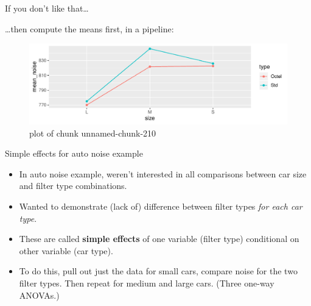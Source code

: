 \documentclass[ignorenonframetext,]{beamer}
\newenvironment{Shaded}{\begin{snugshade}}{\end{snugshade}}
\newcommand{\DataTypeTok}[1]{\textcolor[rgb]{0.13,0.29,0.53}{#1}}
\newcommand{\KeywordTok}[1]{\textcolor[rgb]{0.13,0.29,0.53}{\textbf{#1}}}
\newcommand{\NormalTok}[1]{#1}
\newcommand{\OperatorTok}[1]{\textcolor[rgb]{0.81,0.36,0.00}{\textbf{#1}}}
\newcommand{\StringTok}[1]{\textcolor[rgb]{0.31,0.60,0.02}{#1}}
\begin{document}
\begin{frame}[fragile]{If you don't like that\ldots}
\protect\hypertarget{if-you-dont-like-that}{}

\ldots then compute the means first, in a pipeline:

\footnotesize

\begin{Shaded}
\end{Shaded}

\begin{figure}
\centering
\includegraphics{figure/unnamed-chunk-210-1.pdf}
\caption{plot of chunk unnamed-chunk-210}
\end{figure}

\normalsize

\end{frame}

\begin{frame}{Simple effects for auto noise example}
\protect\hypertarget{simple-effects-for-auto-noise-example}{}

\begin{itemize}
\item
  In auto noise example, weren't interested in all comparisons between
  car size and filter type combinations.
\item
  Wanted to demonstrate (lack of) difference between filter types
  \emph{for each car type}.
\item
  These are called \textbf{simple effects} of one variable (filter type)
  conditional on other variable (car type).
\item
  To do this, pull out just the data for small cars, compare noise for
  the two filter types. Then repeat for medium and large cars. (Three
  one-way ANOVAs.)
\end{itemize}

\end{frame}
\end{document}
